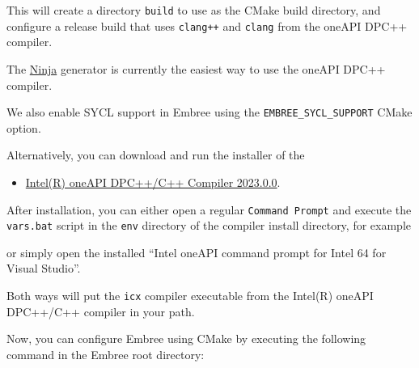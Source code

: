 This will create a directory \texttt{build} to use as the CMake build
directory, and configure a release build that uses \texttt{clang++} and
\texttt{clang} from the oneAPI DPC++ compiler.

The \href{https://ninja-build.org/}{Ninja} generator is currently the
easiest way to use the oneAPI DPC++ compiler.

We also enable SYCL support in Embree using the
\texttt{EMBREE\_SYCL\_SUPPORT} CMake option.

Alternatively, you can download and run the installer of the

\begin{itemize}
\tightlist
\item
  \href{https://www.intel.com/content/www/us/en/developer/articles/tool/oneapi-standalone-components.html\#dpcpp-cpp}{Intel(R)
  oneAPI DPC++/C++ Compiler 2023.0.0}.
\end{itemize}

After installation, you can either open a regular
\texttt{Command\ Prompt} and execute the \texttt{vars.bat} script in the
\texttt{env} directory of the compiler install directory, for example

\begin{Shaded}
\begin{Highlighting}[]
\OperatorTok{:}\OperatorTok{(}\OperatorTok{)}
\end{Highlighting}
\end{Shaded}

or simply open the installed ``Intel oneAPI command prompt for Intel 64
for Visual Studio''.

Both ways will put the \texttt{icx} compiler executable from the
Intel(R) oneAPI DPC++/C++ compiler in your path.

Now, you can configure Embree using CMake by executing the following
command in the Embree root directory:

\begin{Shaded}
\begin{Highlighting}[]
\OperatorTok{{-}}
      \OperatorTok{{-}}
      \OperatorTok{{-}}\OperatorTok{=}
      \OperatorTok{{-}}\OperatorTok{=}
      \OperatorTok{{-}}\OperatorTok{=}
      \OperatorTok{{-}}\OperatorTok{=}
      \OperatorTok{{-}}\OperatorTok{=}
\end{Highlighting}
\end{Shaded}

